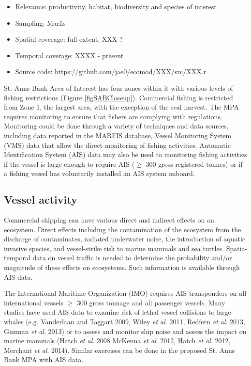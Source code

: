 \documentclass[letterpaper,portrait,11pt]{scrartcl}
\numberwithin{equation}{section}		%
\numberwithin{figure}{section}			%
\numberwithin{table}{section}				%
\begin{document}
\begin{itemize}
  \item Relevance:  productivity, habitat, biodiversity and species of interest
  \item Sampling:  Marfis
  \item Spatial coverage: full extent, XXX ?
  \item Temporal coverage: XXXX - present
  \item Source code: https://github.com/jae0/ecomod/XXX/src/XXX.r
\end{itemize}	




St. Anns Bank Area of Interest has four zones within it with various levels of fishing restrictions (Figure \ref{figSABCloseup}). Commercial fishing is restricted from Zone 1, the largest area, with the exception of the seal harvest.  The MPA requires monitoring to ensure that fishers are complying with regulations.  Monitoring could be done through a variety of techniques and data sources, including data reported in the MARFIS database, Vessel Monitoring System (VMS) data that allow the direct monitoring of fishing activities. Automatic Identification System (AIS) data may also be used to monitoring fishing activities if the vessel is large enough to require AIS ($\geq$ 300 gross registered tonnes) or if a fishing vessel has voluntarily installed an AIS system onboard.  




\subsection{Vessel activity}
Commercial shipping can have various direct and indirect effects on an ecosystem. Direct effects including the contamination of the ecosystem from the discharge of contaminates, radiated underwater noise, the introduction of aquatic invasive species, and vessel-strike risk to marine mammals and sea turtles.  Spatia-temporal data on vessel traffic is needed to determine the probability and/or magnitude of these effects on ecosystems.  Such information is available through AIS data.  

The International Maritime Organization (IMO) requires AIS transponders on all international vessels $\geq$ 300 gross tonnage and all passenger vessels.  Many studies have used AIS data to examine risk of lethal vessel collisions to large whales (e.g. Vanderlaan and Taggart 2009, Wiley \textit{et al}. 2011, Redfern \textit{et al}. 2013,  Guzman \textit{et al}. 2013) or to assess and monitor ship noise and assess the impact on marine mammals (Hatch \textit{et al}. 2008 McKenna \textit{et al}. 2012,  Hatch \textit{et al}. 2012, Merchant \textit{et al}. 2014).    Similar exercises can be done in the proposed St. Anns Bank MPA with AIS data. 
\end{document}
